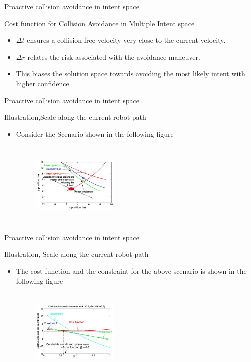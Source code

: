 \documentclass{beamer}
\begin{document}
\begin{frame}{Proactive collision avoidance in intent space}
\begin{block}{Cost function for Collision Avoidance in Multiple Intent space}
\begin{itemize}
\item{$\Delta t$ ensures a collision free velocity very close to the current velocity.}
\item{$\Delta r$ relates the risk associated with the avoidance maneuver.}
\item{This biases the solution space towards avoiding the most likely intent with higher confidence.}
\end{itemize}

\end{block}
\end{frame}
\begin{frame}{Proactive collision avoidance in intent space}
\begin{block}{Illustration,Scale along the current robot path}
\begin{itemize}
\item{Consider the Scenario shown in the following figure}
\begin{figure}
\includegraphics[width= 4.1cm, height=4.1cm]{fig11.eps}
\end{figure}

\end{itemize}

\end{block}
\end{frame}
\begin{frame}{Proactive collision avoidance in intent space}
\begin{block}{Illustration, Scale along the current robot path}
\begin{itemize}
\item{The cost function and the constraint for the above scenario is shown in the following figure}
\begin{figure}
\includegraphics[width= 4.1cm, height=4.1cm]{fig12.eps}
\end{figure}
\end{itemize}

\end{block}
\end{frame}
\end{document}
